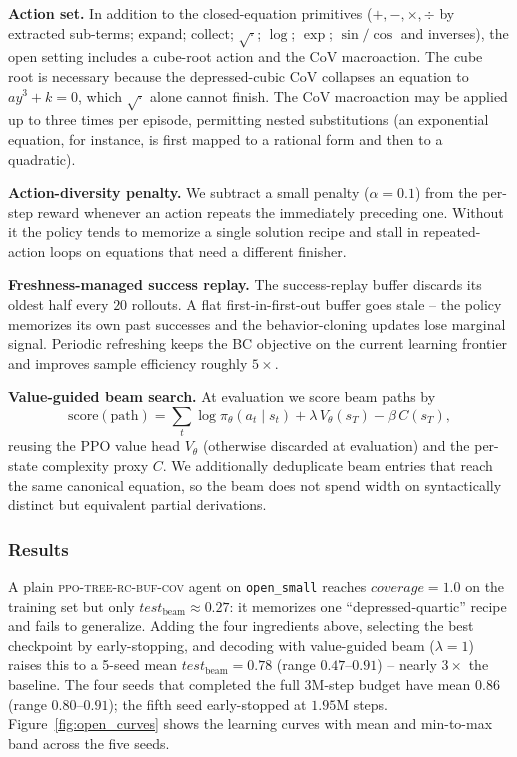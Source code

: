 \documentclass{article}
\theoremstyle{plain}
\theoremstyle{definition}
\theoremstyle{remark}
\begin{document}
\textbf{Action set.} In addition to the closed-equation primitives ($+,-,\times,\div$ by extracted sub-terms; expand; collect; $\sqrt{\cdot}$; $\log$; $\exp$; $\sin/\cos$ and inverses), the open setting includes a cube-root action and the CoV macroaction. The cube root is necessary because the depressed-cubic CoV collapses an equation to $a y^3 + k = 0$, which $\sqrt{\cdot}$ alone cannot finish. The CoV macroaction may be applied up to three times per episode, permitting nested substitutions (an exponential equation, for instance, is first mapped to a rational form and then to a quadratic).

\textbf{Action-diversity penalty.} We subtract a small penalty ($\alpha = 0.1$) from the per-step reward whenever an action repeats the immediately preceding one. Without it the policy tends to memorize a single solution recipe and stall in repeated-action loops on equations that need a different finisher.

\textbf{Freshness-managed success replay.} The success-replay buffer discards its oldest half every $20$ rollouts. A flat first-in-first-out buffer goes stale -- the policy memorizes its own past successes and the behavior-cloning updates lose marginal signal. Periodic refreshing keeps the BC objective on the current learning frontier and improves sample efficiency roughly $5\times$.

\textbf{Value-guided beam search.} At evaluation we score beam paths by
\begin{equation}
\label{eq:value_beam}
\text{score}(\text{path}) = \sum_t \log \pi_\theta(a_t \mid s_t) + \lambda\, V_\theta(s_T) - \beta\, C(s_T),
\end{equation}
reusing the PPO value head $V_\theta$ (otherwise discarded at evaluation) and the per-state complexity proxy $C$. We additionally deduplicate beam entries that reach the same canonical equation, so the beam does not spend width on syntactically distinct but equivalent partial derivations.

\subsubsection{Results}
\label{sec:open_results}
A plain \textsc{ppo-tree-rc-buf-cov} agent on \texttt{open\_small} reaches $\textit{coverage}=1.0$ on the training set but only $\textit{test}_{\text{beam}} \approx 0.27$: it memorizes one ``depressed-quartic'' recipe and fails to generalize. Adding the four ingredients above, selecting the best checkpoint by early-stopping, and decoding with value-guided beam ($\lambda = 1$) raises this to a 5-seed mean $\textit{test}_{\text{beam}} = \mathbf{0.78}$ (range $0.47$--$0.91$) -- nearly $3\times$ the baseline. The four seeds that completed the full $3\text{M}$-step budget have mean $0.86$ (range $0.80$--$0.91$); the fifth seed early-stopped at $1.95\text{M}$ steps. Figure~\ref{fig:open_curves} shows the learning curves with mean and min-to-max band across the five seeds.
\end{document}
